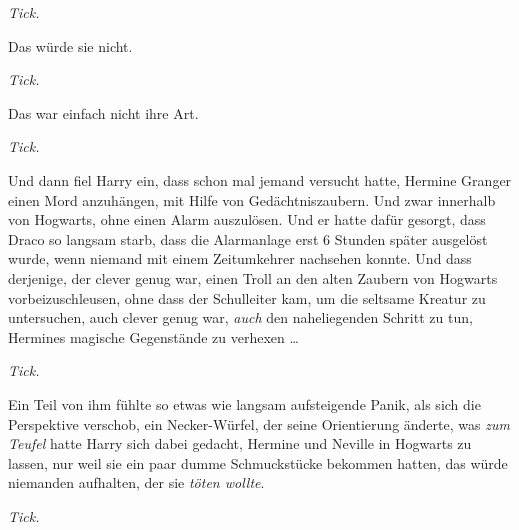 \emph{Tick.}

Das würde sie nicht.

\emph{Tick.}

Das war einfach nicht ihre Art.

\emph{Tick.}

Und dann fiel Harry ein, dass schon mal jemand versucht hatte, Hermine Granger einen Mord anzuhängen, mit Hilfe von Gedächtniszaubern. Und zwar innerhalb von Hogwarts, ohne einen Alarm auszulösen. Und er hatte dafür gesorgt, dass Draco so langsam starb, dass die Alarmanlage erst 6 Stunden später ausgelöst wurde, wenn niemand mit einem Zeitumkehrer nachsehen konnte. Und dass derjenige, der clever genug war, einen Troll an den alten Zaubern von Hogwarts vorbeizuschleusen, ohne dass der Schulleiter kam, um die seltsame Kreatur zu untersuchen, auch clever genug war, \emph{auch} den naheliegenden Schritt zu tun, Hermines magische Gegenstände zu verhexen …

\emph{Tick.}

Ein Teil von ihm fühlte so etwas wie langsam aufsteigende Panik, als sich die Perspektive verschob, ein Necker-Würfel, der seine Orientierung änderte, was \emph{zum Teufel} hatte Harry sich dabei gedacht, Hermine und Neville in Hogwarts zu lassen, nur weil sie ein paar dumme Schmuckstücke bekommen hatten, das würde niemanden aufhalten, der sie \emph{töten wollte}.

\emph{Tick.}

